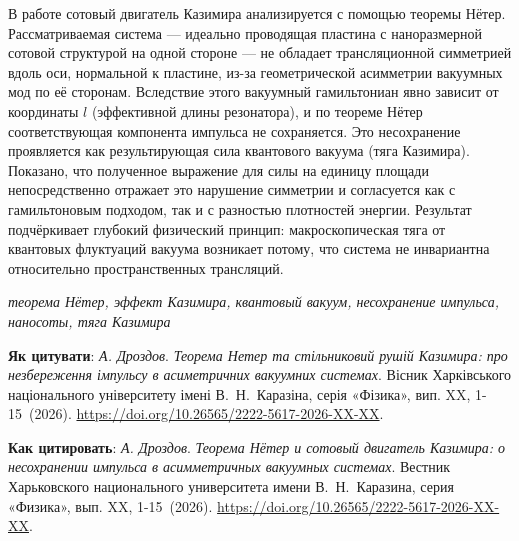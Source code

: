 \documentclass[twoside, 10pt]{article}
\def\myfirstpage{1}
\def\mylastpage{15}
\def\mypages{\myfirstpage-\mylastpage}
\def\myname{А. Дроздов}
\def\mynameukr{А. Дроздов}
\def\mytitle{Теорема Нётер и сотовый двигатель Казимира: о несохранении импульса в асимметричных вакуумных системах}
\def\mytitleukr{Теорема Нетер та стільниковий рушій Казимира: про незбереження імпульсу в асиметричних вакуумних системах}
\def\mydoi{10.26565/2222-5617-2026-XX-XX} %
\def\ukrvisnyk{Вісник Харківського національного університету імені В.~Н.~Каразіна, серія «Фізика», вип. XX, \mypages~(2026)}
\def\ruvisnyk{Вестник Харьковского национального университета имени В.~Н.~Каразина, серия «Физика», вып. XX, \mypages~(2026)}
\begin{document}
\vspace{5mm}

В работе сотовый двигатель Казимира анализируется с помощью теоремы Нётер.
Рассматриваемая система — идеально проводящая пластина с наноразмерной сотовой структурой
на одной стороне — не обладает трансляционной симметрией вдоль оси, нормальной к пластине,
из-за геометрической асимметрии вакуумных мод по её сторонам.
Вследствие этого вакуумный гамильтониан явно зависит
от координаты \(l\) (эффективной длины резонатора), и по теореме Нётер
соответствующая компонента импульса не сохраняется.
Это несохранение проявляется как результирующая сила квантового вакуума (тяга Казимира).
Показано, что полученное выражение для силы на единицу площади непосредственно отражает это нарушение симметрии
и согласуется как с гамильтоновым подходом, так и с разностью плотностей энергии.
Результат подчёркивает глубокий физический принцип: макроскопическая тяга от квантовых флуктуаций вакуума
возникает потому, что система не инвариантна относительно пространственных трансляций.

\vspace{5mm}

\noindent
\begin{keywords}
\textit{теорема Нётер, эффект Казимира, квантовый вакуум, несохранение импульса, наносоты, тяга Казимира}
\end{keywords}

\vspace{5mm}

\noindent
\textbf{Як цитувати}: \textit{\mynameukr}. \textit{\mytitleukr}. {\ukrvisnyk}. \href{https://doi.org/\mydoi} {https://doi.org/\mydoi}.

\vspace{5mm}

\noindent
\textbf{Как цитировать}: \textit{\myname}. \textit{\mytitle}. {\ruvisnyk}. \href{https://doi.org/\mydoi} {https://doi.org/\mydoi}.

\vspace{5mm}

\newpage
\end{document}
